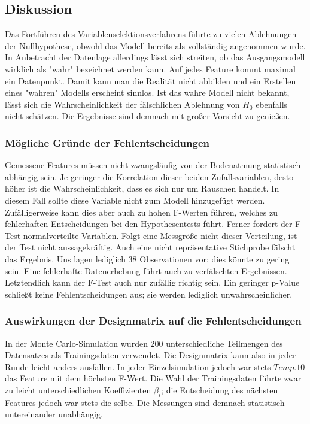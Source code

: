 \subsection{Diskussion}
Das Fortführen des Variablenselektionsverfahrens führte zu vielen Ablehnungen der Nullhypothese, obwohl das Modell bereits als vollständig angenommen wurde.
In Anbetracht der Datenlage allerdings lässt sich streiten, ob das Ausgangsmodell wirklich als "wahr" bezeichnet werden kann.
Auf jedes Feature kommt maximal ein Datenpunkt.
Damit kann man die Realität nicht abbilden und ein Erstellen eines "wahren" Modells erscheint sinnlos.
Ist das wahre Modell nicht bekannt, lässt sich die Wahrscheinlichkeit der fälschlichen Ablehnung von $H_0$ ebenfalls nicht schätzen.
Die Ergebnisse sind demnach mit großer Vorsicht zu genießen.

\subsubsection{Mögliche Gründe der Fehlentscheidungen}
Gemessene Features müssen nicht zwangsläufig von der Bodenatmung statistisch abhängig sein.
Je geringer die Korrelation dieser beiden Zufallsvariablen, desto höher ist die Wahrscheinlichkeit, dass es sich nur um Rauschen handelt.
In diesem Fall sollte diese Variable nicht zum Modell hinzugefügt werden.
Zufälligerweise kann dies aber auch zu hohen F-Werten führen, welches zu fehlerhaften Entscheidungen bei den Hypothesentests führt.
Ferner fordert der F-Test normalverteilte Variablen.
Folgt eine Messgröße nicht dieser Verteilung, ist der Test nicht aussagekräftig.
Auch eine nicht repräsentative Stichprobe fälscht das Ergebnis.
Uns lagen lediglich 38 Observationen vor; dies könnte zu gering sein.
Eine fehlerhafte Datenerhebung führt auch zu verfälschten Ergebnissen.
Letztendlich kann der F-Test auch nur zufällig richtig sein.
Ein geringer p-Value schließt keine Fehlentscheidungen aus; sie werden lediglich unwahrscheinlicher.

\subsubsection{Auswirkungen der Designmatrix auf die Fehlentscheidungen}
In der Monte Carlo-Simulation wurden 200 unterschiedliche Teilmengen des Datensatzes als Trainingsdaten verwendet.
Die Designmatrix kann also in jeder Runde leicht anders ausfallen.
In jeder Einzelsimulation jedoch war stets $Temp.10$ das Feature mit dem höchsten F-Wert.
Die Wahl der Trainingsdaten führte zwar zu leicht unterschiedlichen Koeffizienten $\beta_i$; die Entscheidung des nächsten Features jedoch war stets die selbe.
Die Messungen sind demnach statistisch untereinander unabhängig.

